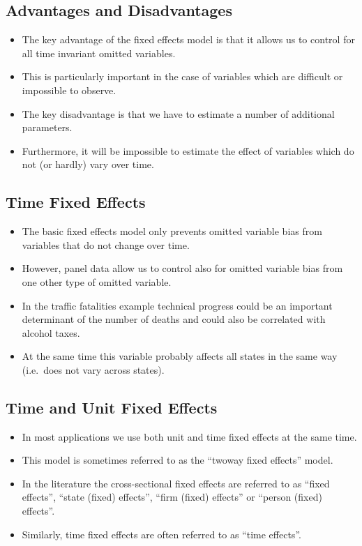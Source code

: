 \documentclass[]{article}
\theoremstyle{definition}
\theoremstyle{definition}
\theoremstyle{remark}
\begin{document}
\subsection{Advantages and
Disadvantages}\label{advantages-and-disadvantages}

\begin{itemize}
\item
  The key advantage of the fixed effects model is that it allows us to
  control for all time invariant omitted variables.
\item
  This is particularly important in the case of variables which are
  difficult or impossible to observe.
\item
  The key disadvantage is that we have to estimate a number of
  additional parameters.
\item
  Furthermore, it will be impossible to estimate the effect of variables
  which do not (or hardly) vary over time.
\end{itemize}

\subsection{Time Fixed Effects}\label{time-fixed-effects}

\begin{itemize}
\item
  The basic fixed effects model only prevents omitted variable bias from
  variables that do not change over time.
\item
  However, panel data allow us to control also for omitted variable bias
  from one other type of omitted variable.
\item
  In the traffic fatalities example technical progress could be an
  important determinant of the number of deaths and could also be
  correlated with alcohol taxes.
\item
  At the same time this variable probably affects all states in the same
  way (i.e.~does not vary across states).
\end{itemize}

\subsection{Time and Unit Fixed
Effects}\label{time-and-unit-fixed-effects}

\begin{itemize}
\item
  In most applications we use both unit and time fixed effects at the
  same time.
\item
  This model is sometimes referred to as the ``twoway fixed effects''
  model.
\item
  In the literature the cross-sectional fixed effects are referred to as
  ``fixed effects'', ``state (fixed) effects'', ``firm (fixed) effects''
  or ``person (fixed) effects''.
\item
  Similarly, time fixed effects are often referred to as ``time
  effects''.
\end{itemize}
\end{document}

